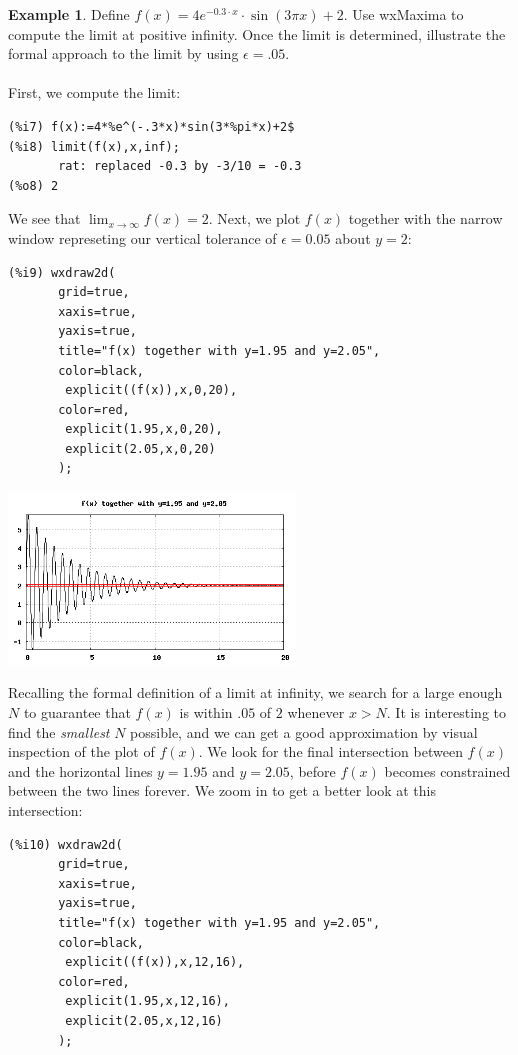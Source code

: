 \documentclass[10.5pt,twoside]{report}
\theoremstyle{definition}
\newtheorem{exmp}{Example}[section]
\begin{document}
\begin{exmp}  Define $f(x)=4e^{-0.3\cdot x}\cdot\sin{(3 \pi x)}+2$.  Use wxMaxima to compute the limit at positive infinity.  Once the limit is determined, illustrate the formal approach to the limit by using $\epsilon=.05$.\\
${}$\\

First, we compute the limit:

\begin{verbatim}
(%i7) f(x):=4*%e^(-.3*x)*sin(3*%pi*x)+2$
(%i8) limit(f(x),x,inf);
       rat: replaced -0.3 by -3/10 = -0.3
(%o8) 2
\end{verbatim}

We see that $\lim_{x \to \infty}f(x)=2$.  Next, we plot $f(x)$ together with the narrow window represeting our vertical tolerance of $\epsilon=0.05$ about $y=2$:

\begin{verbatim}
(%i9) wxdraw2d(
       grid=true,
       xaxis=true,
       yaxis=true,
       title="f(x) together with y=1.95 and y=2.05",
       color=black,
        explicit((f(x)),x,0,20),
       color=red,
        explicit(1.95,x,0,20),
        explicit(2.05,x,0,20)
       );
\end{verbatim}

\includegraphics[width=3in]{example_3_3_2_1}

Recalling the formal definition of a limit at infinity, we search for a large enough $N$ to guarantee that $f(x)$ is within $.05$ of $2$ whenever $x>N$.  It is interesting to find the \textit{smallest} $N$ possible, and we can get a good approximation by visual inspection of the plot of $f(x)$.  We look for the final intersection between $f(x)$ and the horizontal lines $y=1.95$ and $y=2.05$, before $f(x)$ becomes constrained between the two lines forever.  We zoom in to get a better look at this intersection:

\begin{verbatim}
(%i10) wxdraw2d(
       grid=true,
       xaxis=true,
       yaxis=true,
       title="f(x) together with y=1.95 and y=2.05",
       color=black,
        explicit((f(x)),x,12,16),
       color=red,
        explicit(1.95,x,12,16),
        explicit(2.05,x,12,16)
       );
\end{verbatim}


\end{exmp}
\end{document}
